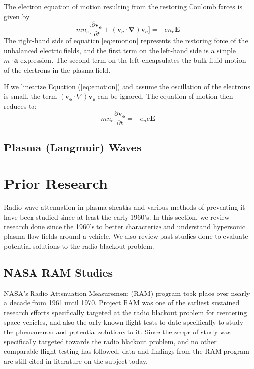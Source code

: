 \documentclass[twocolumn]{article}
\begin{document}
The electron equation of motion resulting from the restoring Coulomb forces is given by
\begin{equation} \label{eq:emotion}
	mn_e \lbrack \frac{\partial \mathbf{v_e}}{\partial t} + \left( \mathbf{v_e} \cdot \mathbf{\nabla} \right) \mathbf{v_e} \rbrack = -en_e\mathbf{E}
\end{equation}
The right-hand side of equation \ref{eq:emotion} represents the restoring force of the unbalanced electric fields, and the first term on the left-hand side is a simple $m\cdot\mathbf{a}$ expression.
The second term on the left encapsulates the bulk fluid motion of the electrons in the plasma field.

If we linearize Equation (\ref{eq:emotion}) and assume the oscillation of the electrons is small, the term $\left(\mathbf{v_e} \cdot \nabla \right) \mathbf{v_e}$ can be ignored.
The equation of motion then reduces to:
\begin{equation}
	mn_e \frac{\partial \mathbf{v_e}}{\partial t} = -e_ne \mathbf{E}
\end{equation}

\subsection*{Plasma (Langmuir) Waves}


\section{Prior Research} \label{sec:Prior}
Radio wave attenuation in plasma sheaths and various methods of preventing it have been studied since at least the early 1960's.
In this section, we review research done since the 1960's to better characterize and understand hypersonic plasma flow fields around a vehicle.
We also review past studies done to evaluate potential solutions to the radio blackout problem.

	\subsection*{NASA RAM Studies}
	NASA's Radio Attenuation Measurement (RAM) program took place over nearly a decade from 1961 until 1970.
	Project RAM was one of the earliest sustained research efforts specifically targeted at the radio blackout problem for reentering space vehicles, and also the only known flight tests to date specifically to study the phenomenon and potential solutions to it.
	Since the scope of study was specifically targeted towards the radio blackout problem, and no other comparable flight testing has followed, data and findings from the RAM program are still cited in literature on the subject today.
	
\end{document}
